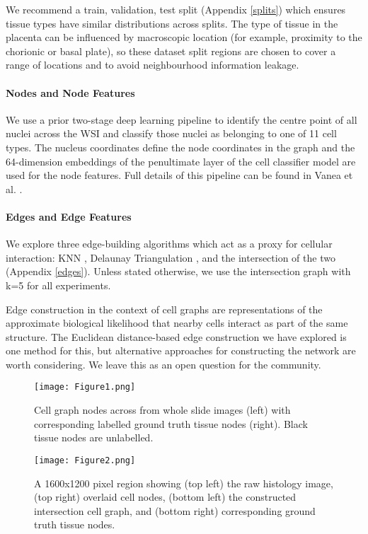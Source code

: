 \documentclass{article}
\begin{document}
We recommend a train, validation, test split (Appendix \ref{splits}) which ensures tissue types have similar distributions across splits. The type of tissue in the placenta can be influenced by macroscopic location (for example, proximity to the chorionic or basal plate), so these dataset split regions are chosen to cover a range of locations and to avoid neighbourhood information leakage.

\paragraph{Nodes and Node Features} We use a prior two-stage deep learning pipeline to identify the centre point of all nuclei across the WSI and classify those nuclei as belonging to one of 11 cell types. The nucleus coordinates define the node coordinates in the graph and the 64-dimension embeddings of the penultimate layer of the cell classifier model are used for the node features. Full details of this pipeline can be found in Vanea et al. \cite{vanea_happy_nodate}.

\paragraph{Edges and Edge Features} We explore three edge-building algorithms which act as a proxy for cellular interaction: KNN \cite{eppstein_nearest-neighbor_1997}, Delaunay Triangulation \cite{guibas_randomized_1992}, and the intersection of the two (Appendix \ref{edges}). Unless stated otherwise, we use the intersection graph with k=5 for all experiments.

Edge construction in the context of cell graphs are representations of the approximate biological likelihood that nearby cells interact as part of the same structure. The Euclidean distance-based edge construction we have explored is one method for this, but alternative approaches for constructing the network are worth considering. We leave this as an open question for the community. 


\begin{figure}
  \centering
  \texttt{[image: Figure1.png]}
  \caption{Cell graph nodes across from whole slide images (left) with corresponding labelled ground truth tissue nodes (right). Black tissue nodes are unlabelled.}
  \label{fig-1}
\end{figure}

\begin{figure}
  \centering
  \texttt{[image: Figure2.png]}
  \caption{A 1600x1200 pixel region showing (top left) the raw histology image, (top right) overlaid cell nodes, (bottom left) the constructed intersection cell graph, and (bottom right) corresponding ground truth tissue nodes.}
  \label{fig-2}
\end{figure}
\end{document}
